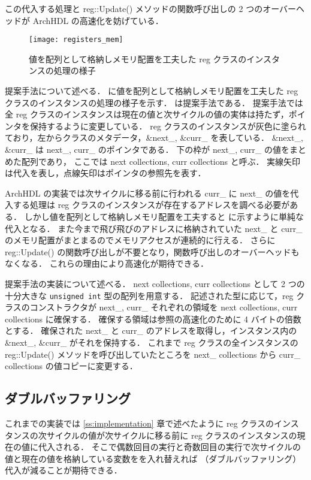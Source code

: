 この代入する処理と reg::Update() メソッドの関数呼び出しの 2 つのオーバーヘッドが ArchHDL の高速化を妨げている．

\begin{figure}[t]
 \centering
 \texttt{[image: registers\_mem]}
 \caption{値を配列として格納しメモリ配置を工夫した reg クラスのインスタンスの処理の様子}
 \label{fig:mem_copy}
\end{figure}

提案手法について述べる．
 に値を配列として格納しメモリ配置を工夫した reg クラスのインスタンスの処理の様子を示す．
 は提案手法である．
提案手法では全 reg クラスのインスタンスは現在の値と次サイクルの値の実体は持たず，ポインタを保持するように変更している．
reg クラスのインスタンスが灰色に塗られており，左からクラスのメタデータ，\&next\_, \&curr\_ を表している．
\&next\_, \&curr\_ は next\_, curr\_ のポインタである．
下の枠が next\_, curr\_ の値をまとめた配列であり，
ここでは next collections, curr collections と呼ぶ．
実線矢印は代入を表し，点線矢印はポインタの参照先を表す．

ArchHDL の実装では次サイクルに移る前に行われる curr\_ に next\_ の値を代入する処理は
reg クラスのインスタンスが存在するアドレスを調べる必要がある．
しかし値を配列として格納しメモリ配置を工夫すると に示すように単純な代入となる．
また今まで飛び飛びのアドレスに格納されていた next\_ と curr\_ のメモリ配置がまとまるのでメモリアクセスが連続的に行える．
さらに reg::Update() の関数呼び出しが不要となり，関数呼び出しのオーバーヘッドもなくなる．
これらの理由により高速化が期待できる．

提案手法の実装について述べる．
next collections, curr collections として 2 つの十分大きな \verb/unsigned int/ 型の配列を用意する．
記述された型に応じて，reg クラスのコンストラクタが next\_, curr\_ それぞれの領域を next collections, curr collections に確保する．
確保する領域は参照の高速化のために 4 バイトの倍数とする．
確保された next\_ と curr\_ のアドレスを取得し，インスタンス内の \&next\_, \&curr\_ がそれを保持する．
これまで reg クラスの全インスタンスの reg::Update() メソッドを呼び出していたところを next\_ collections から curr\_ collections の値コピーに変更する．


\subsection{ダブルバッファリング}

これまでの実装では \ref{ss:implementation} 章で述べたように
reg クラスのインスタンスの次サイクルの値が次サイクルに移る前に reg クラスのインスタンスの現在の値に代入される．
そこで偶数回目の実行と奇数回目の実行で次サイクルの値と現在の値を格納している変数をを入れ替えれば
（ダブルバッファリング）代入が減ることが期待できる．

